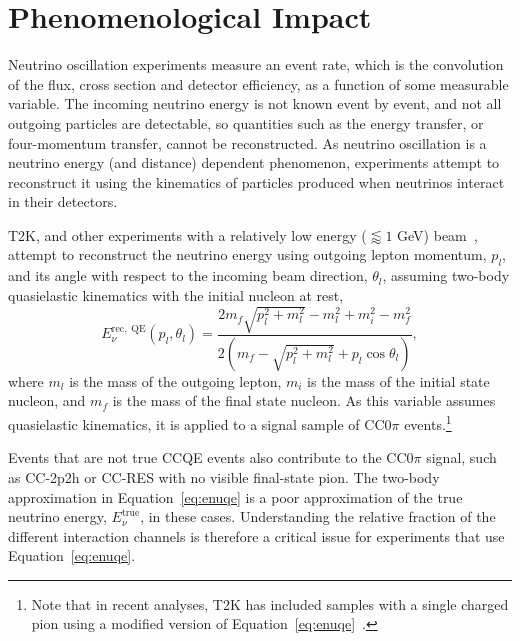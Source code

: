 \documentclass{ar-1col}
\begin{document}
\section{Phenomenological Impact\label{sec:impact}}

Neutrino oscillation experiments measure an event rate, which is the convolution of the flux, cross section and detector efficiency, as a function of some measurable variable. The incoming neutrino energy is not known event by event, and not all outgoing particles are detectable, so quantities such as the energy transfer, or four-momentum transfer, cannot be reconstructed. As neutrino oscillation is a neutrino energy (and distance) dependent phenomenon, experiments attempt to reconstruct it using the kinematics of particles produced when neutrinos interact in their detectors.

T2K, and other experiments with a relatively low energy ($\lessapprox1$ GeV) beam~\cite{Hyper-Kamiokande:2018ofw, MiniBooNE:2020pnu}, attempt to reconstruct the neutrino energy using outgoing lepton momentum, $p_{l}$, and its angle with respect to the incoming beam direction, $\theta_{l}$, assuming two-body quasielastic kinematics with the initial nucleon at rest,
\begin{equation}
E^{\mathrm{rec,\;QE}}_{\nu}\left(p_{l}, \theta_{l}\right) = \frac{2m_f\sqrt{p_{l}^2 + m^2_l} - m_l^2 + m_i^2-m_f^{2}}{2\left(m_f-\sqrt{p_{l}^2 + m^2_l}+p_l \cos\theta_l\right)},
\label{eq:enuqe}
\end{equation}
\noindent where $m_l$ is the mass of the outgoing lepton, $m_{i}$ is the mass of the initial state nucleon, and $m_{f}$ is the mass of the final state nucleon. As this variable assumes quasielastic kinematics, it is applied to a signal sample of CC0$\pi$ events.\footnote{Note that in recent analyses, T2K has included samples with a single charged pion using a modified version of Equation~\eqref{eq:enuqe}~\cite{T2K:2017rgv, T2K:2019bcf, T2K:2021xwb}.}%
\begin{marginnote}
\end{marginnote}%
Events that are not true CCQE events also contribute to the CC0$\pi$ signal, such as CC-2p2h or CC-RES with no visible final-state pion. The two-body approximation in Equation~\eqref{eq:enuqe} is a poor approximation of the true neutrino energy, $E_{\nu}^{\mathrm{true}}$, in these cases. Understanding the relative fraction of the different interaction channels is therefore a critical issue for experiments that use Equation~\eqref{eq:enuqe}.
\end{document}
